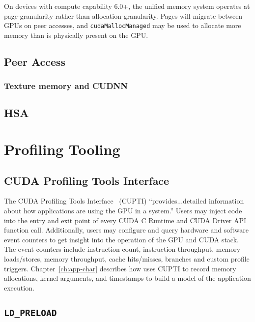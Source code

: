On devices with compute capability 6.0+, the unified memory system operates at page-granularity rather than allocation-granularity.
Pages will migrate between GPUs on peer accesses, and \texttt{cudaMallocManaged} may be used to allocate more memory than is physically present on the GPU.


\subsection{Peer Access}

\subsubsection{Texture memory and CUDNN}

\subsection{HSA}
\label{sec:hsa}


\section{Profiling Tooling}

\subsection{CUDA Profiling Tools Interface}
\label{sec:cupti}

The CUDA Profiling Tools Interface~\cite{nvidia2017cupti} (CUPTI) ``provides...detailed information about how applications are using the GPU in a system.''
Users may inject code into the entry and exit point of every CUDA C Runtime and CUDA Driver API function call.
Additionally, users may configure and query hardware and software event counters to get insight into the operation of the GPU and CUDA stack.
The event counters include instruction count, instruction throughput, memory loads/stores, memory throughput, cache hits/misses, branches and custom profile triggers.
Chapter~\ref{ch:app-char} describes how  uses CUPTI to record memory allocations, kernel arguments, and timestamps to build a model of the application execution.

\subsection{\texttt{LD\_PRELOAD}}
\label{sec:ldpreload}

